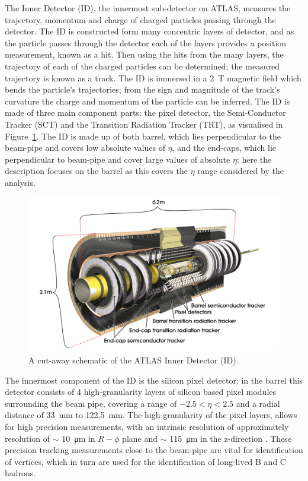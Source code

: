 The Inner Detector (ID), the innermost sub-detector on ATLAS,
measures the trajectory, momentum and charge of charged particles passing through the detector.
The ID is constructed form many concentric layers of detector,
and as the particle passes through the detector each of the layers provides a position measurement, known as a hit.
Then using the hits from the many layers, the trajectory of each of the charged particles can be determined;
the measured trajectory is known as a track.
The ID is immersed in a 2~T magnetic field which bends the particle's trajectories;
from the sign and magnitude of the track's curvature the charge and momentum of the particle can be inferred.
The ID is made of three main component parts; the pixel detector, the Semi-Conductor Tracker
(SCT) and the Transition Radiation Tracker (TRT), as visualised in Figure~\ref{fig:det-ID_schem}.
The ID is made up of both barrel, which lies perpendicular to the beam-pipe and covers low absolute values of $\eta$,
and the end-caps, which lie perpendicular to beam-pipe and cover large values of absolute $\eta$:
here the description focuses on the barrel as this covers the $\eta$ range considered by the analysis.\\

\begin{figure}[!ht]
  \begin{center}
    \includegraphics[width=1\linewidth, angle=0]{figs/Detector/ID_schem.pdf}
  \end{center}
  \caption{
    A cut-away schematic of the ATLAS Inner Detector (ID).}
  \label{fig:det-ID_schem}
\end{figure}

The innermost component of the ID is the silicon pixel detector;
in the barrel this detector consists of 4 high-granularity layers of silicon based pixel modules surrounding the beam pipe,
covering a range of $-2.5 < \eta < 2.5$ and a radial distance of \SI{33}{mm} to \SI{122.5}{mm}.
The high-granularity of the pixel layers, allows for high precision measurements,
with an intrinsic resolution of approximately resolution of $\sim$ \SI{10}{\micro\metre} in $R-\phi$ plane
and $\sim$ \SI{115}{\micro\metre} in the z-direction \cite{det-IBL_TDR, det-IBL_Talk}.
These precision tracking measurements close to the beam-pipe are vital for identification of vertices,
which in turn are used for the identification of long-lived B and C hadrons.\\

